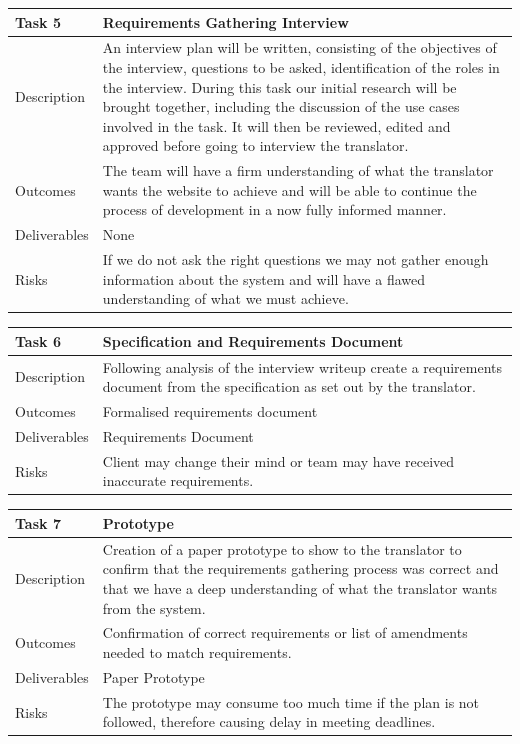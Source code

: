 \documentclass{l3proj}
\begin{document}
\begin{center}
    \begin{tabular}{ | l | p{12cm} |}
    \hline	
    Task 5 & Requirements Gathering Interview \\ \hline
    Description & An interview plan will be written, consisting
          of the objectives of the interview, questions to be asked,
          identification of the roles in the interview. During this task our initial research will be brought together, including the discussion of the use cases involved in the task. It will then be
          reviewed, edited and approved before going to interview the translator. \\ \hline   
    Outcomes & The team will have a firm understanding of what the translator wants the website to achieve and will be able to continue the process of development in a now fully informed manner. \\ \hline
    Deliverables & None \\ \hline
    Risks & If we do not ask the right questions we may not gather enough information about the system and will have a flawed understanding of what we must achieve. \\ 
    \hline
    \end{tabular}
\end{center}

\begin{center}
    \begin{tabular}{ | l | p{12cm} |}
    \hline	
    Task 6 & Specification and Requirements Document \\ \hline
    Description & Following analysis of the interview writeup create a requirements document from the specification as set out by the translator. \\ \hline   
    Outcomes & Formalised requirements document \\ \hline
    Deliverables & Requirements Document \\ \hline
    Risks & Client may change their mind or team may have received inaccurate requirements. \\ 
    \hline
    \end{tabular}
\end{center}

\begin{center}
    \begin{tabular}{ | l | p{12cm} |}
    \hline	
    Task 7 & Prototype \\ \hline
    Description & Creation of a paper prototype to show to the translator to confirm that the requirements gathering process was correct and that we have a deep understanding of what the translator wants from the system. \\ \hline   
    Outcomes & Confirmation of correct requirements or list of amendments needed to match requirements. \\ \hline
    Deliverables & Paper Prototype \\ \hline
    Risks & The prototype may consume too much time if the plan is not followed, therefore causing delay in meeting deadlines. \\ 
    \hline
    \end{tabular}
\end{center}
\end{document}
